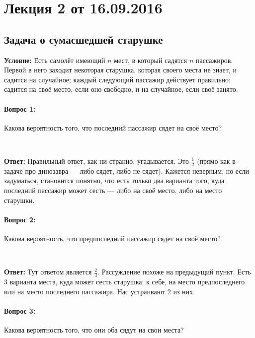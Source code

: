 
\newcommand\independent{\protect\mathpalette{\protect\independenT}{\perp}}
\def\independenT#1#2{\mathrel{\rlap{$#1#2$}\mkern2mu{#1#2}}}



\section*{Лекция 2 от 16.09.2016}

\subsection{Задача о сумасшедшей старушке}

\textbf{Условие:} Есть самолёт имеющий $n$ мест, в который садятся $n$ пассажиров. Первой в него заходит некоторая старушка, которая своего места не знает, и садится на случайное; каждый следующий пассажир действует правильно: садится на своё место, если оно свободно, и на случайное, если своё занято. 

\paragraph{Вопрос 1:} Какова вероятность того, что последний пассажир сядет на своё место?

~\

\noindent\textbf{Ответ:} Правильный ответ, как ни странно, угадывается. Это $\frac{1}{2}$ (прямо как в задаче про динозавра --- либо сядет, либо не сядет). Кажется неверным, но если задуматься, становится понятно, что есть только два варианта того, куда последний пассажир может сесть --- либо на своё место, либо на место старушки. 

\paragraph{Вопрос 2:} Какова вероятность, что предпоследний пассажир сядет на своё место?

~\

\noindent\textbf{Ответ:} Тут ответом является $\frac{2}{3}$. Рассуждение похоже на предыдущий пункт. Есть $3$ варианта места, куда может сесть старушка: к себе, на место предпоследнего или на место последнего пассажира. Нас устраивают $2$ из них.


\paragraph{Вопрос 3:} Какова вероятность того, что они оба сядут на свои места?

